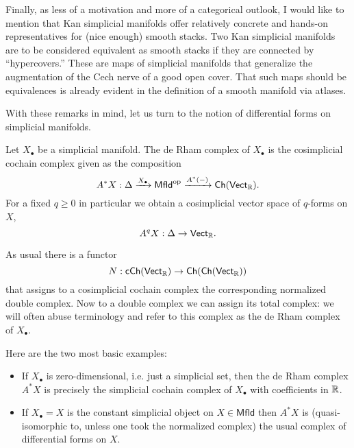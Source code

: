 \documentclass{amsart}
\begin{document}
Finally, as less of a motivation and more of a categorical outlook, I would like 
to mention that Kan simplicial manifolds offer relatively concrete and hands-on
representatives for (nice enough) smooth stacks. Two Kan simplicial 
manifolds are to be considered equivalent as smooth stacks if they are connected 
by ``hypercovers.'' These are maps of simplicial manifolds that generalize the 
augmentation of the Cech nerve of a good open cover. That such maps should be 
equivalences is already evident in the definition of a smooth manifold via 
atlases.

With these remarks in mind, let us turn to the notion of differential forms on 
simplicial manifolds. 
\begin{definition}
    Let $X_\bullet$ be a simplicial manifold. The de Rham complex of $X_\bullet$ 
    is the cosimplicial cochain complex given as the composition
    \begin{equation*}
        A^*X : \Delta \xrightarrow{X_\bullet} \mathsf{Mfld}^{\text{op}}
        \xrightarrow{A^*(-)} \mathsf{Ch}(\mathsf{Vect}_{\mathbb{R}}).
    \end{equation*}
    For a fixed $q\geq 0$ in particular we obtain a cosimplicial vector space of
    $q$-forms on $X$,
    \begin{equation*}
        A^qX : \Delta \to \mathsf{Vect}_{\mathbb{R}}.
    \end{equation*}
\end{definition}

As usual there is a functor
\begin{equation*}
    N: \mathsf{cCh(Vect_{\mathbb{R}})} \to \mathsf{Ch(Ch(Vect_{\mathbb{R}}))}
\end{equation*}
that assigns to a cosimplicial cochain complex the corresponding normalized
double complex. Now to a double 
complex we can assign its total complex: we will often abuse terminology and 
refer to this complex as the de Rham complex of $X_\bullet$.

\begin{example}
    Here are the two most basic examples:
    \begin{itemize}
        \item If $X_\bullet$ is zero-dimensional, i.e. just a simplicial set,
            then the 
            de Rham complex $A^*X$ is precisely the simplicial cochain complex
            of $X_\bullet$ with coefficients in $\mathbb{R}$.
        \item If $X_\bullet=X$ is the constant simplicial object on $X\in 
            \mathsf{Mfld}$ then $A^*X$ is (quasi-isomorphic to, unless one took
            the normalized complex) the usual complex of differential forms on
            $X$.
    \end{itemize}
\end{example}
\end{document}
